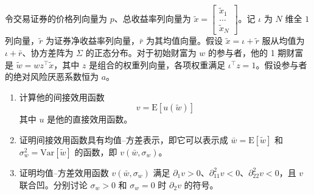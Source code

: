 
\par\noindent\begin{minipage}{\linewidth}
\begin{problem}
 令交易证券的价格列向量为 $p$、总收益率列向量为 $\tilde{x}=\begin{bmatrix}\tilde{x}_{1} \\ \dots \\ \tilde{x}_{N}\end{bmatrix}$。记 $\iota$ 为 $N$ 维全 $1$ 列向量，$\tilde r$ 为证券净收益率列向量，$\bar r$ 为其均值向量。假设 $\tilde{x}=\iota+\tilde{r}$ 服从均值为 $\iota+\bar{r}$、协方差阵为 $\Sigma$ 的正态分布。对于初始财富为 $w$ 的参与者，他的 1 期财富是 $\tilde{w}=wz^{\top}\tilde{x}$，其中 $z$ 是组合的权重列向量，各项权重满足 $\iota^{\top}z=1$。假设参与者的绝对风险厌恶系数恒为 $a$。
\begin{enumerate}[label=(\alph*)]
    \item 计算他的间接效用函数
    \[
        v=\mathrm{E}[u(\tilde{w})]
    \]
    其中 $u$ 是他的直接效用函数。
    \item 证明间接效用函数具有均值--方差表示，即它可以表示成 $\bar{w}=\mathrm{E}[\tilde{w}]$ 和 $\sigma_{w}^{2}=\mathrm{Var}[\tilde{w}]$ 的函数，即 $v(\bar{w},\sigma_{w})$。
    \item 证明均值--方差效用函数 $v(\bar{w},\sigma_{w})$ 满足 $\partial_{1}v>0$、$\partial_{11}^{2}v<0$、$\partial_{22}^{2}v<0$，且 $v$ 联合凹。分别讨论 $\sigma_w>0$ 和 $\sigma_w=0$ 时 $\partial_2v$ 的符号。
\end{enumerate}
\end{problem}
\end{minipage}\par
{}
